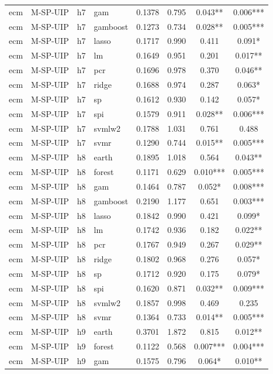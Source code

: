 \begin{ThreePartTable}
\begin{longtable}[t]{llclcccc}
ecm & M-SP-UIP & h7 & gam & 0.1378 & 0.795 & 0.043** & 0.006***\\
ecm & M-SP-UIP & h7 & gamboost & 0.1273 & 0.734 & 0.028** & 0.005***\\
ecm & M-SP-UIP & h7 & lasso & 0.1717 & 0.990 & 0.411 & 0.091*\\
ecm & M-SP-UIP & h7 & lm & 0.1649 & 0.951 & 0.201 & 0.017**\\
ecm & M-SP-UIP & h7 & pcr & 0.1696 & 0.978 & 0.370 & 0.046**\\
ecm & M-SP-UIP & h7 & ridge & 0.1688 & 0.974 & 0.287 & 0.063*\\
ecm & M-SP-UIP & h7 & sp & 0.1612 & 0.930 & 0.142 & 0.057*\\
ecm & M-SP-UIP & h7 & spi & 0.1579 & 0.911 & 0.028** & 0.006***\\
ecm & M-SP-UIP & h7 & svmlw2 & 0.1788 & 1.031 & 0.761 & 0.488\\
ecm & M-SP-UIP & h7 & svmr & 0.1290 & 0.744 & 0.015** & 0.005***\\
\addlinespace
ecm & M-SP-UIP & h8 & earth & 0.1895 & 1.018 & 0.564 & 0.043**\\
ecm & M-SP-UIP & h8 & forest & 0.1171 & 0.629 & 0.010*** & 0.005***\\
ecm & M-SP-UIP & h8 & gam & 0.1464 & 0.787 & 0.052* & 0.008***\\
ecm & M-SP-UIP & h8 & gamboost & 0.2190 & 1.177 & 0.651 & 0.003***\\
ecm & M-SP-UIP & h8 & lasso & 0.1842 & 0.990 & 0.421 & 0.099*\\
ecm & M-SP-UIP & h8 & lm & 0.1742 & 0.936 & 0.182 & 0.022**\\
ecm & M-SP-UIP & h8 & pcr & 0.1767 & 0.949 & 0.267 & 0.029**\\
ecm & M-SP-UIP & h8 & ridge & 0.1802 & 0.968 & 0.276 & 0.057*\\
ecm & M-SP-UIP & h8 & sp & 0.1712 & 0.920 & 0.175 & 0.079*\\
ecm & M-SP-UIP & h8 & spi & 0.1620 & 0.871 & 0.032** & 0.009***\\
ecm & M-SP-UIP & h8 & svmlw2 & 0.1857 & 0.998 & 0.469 & 0.235\\
ecm & M-SP-UIP & h8 & svmr & 0.1364 & 0.733 & 0.014** & 0.005***\\
\addlinespace
ecm & M-SP-UIP & h9 & earth & 0.3701 & 1.872 & 0.815 & 0.012**\\
ecm & M-SP-UIP & h9 & forest & 0.1122 & 0.568 & 0.007*** & 0.004***\\
ecm & M-SP-UIP & h9 & gam & 0.1575 & 0.796 & 0.064* & 0.010**\\

\end{longtable}
\end{ThreePartTable}
